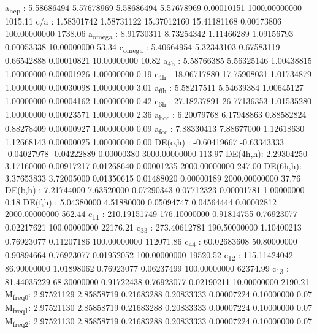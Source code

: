 \documentclass[11pt]{article}
\begin{document}
a\textsubscript{hcp}   :   5.58686494   5.57678969   5.58686494   5.57678969   0.00010151 1000.00000000      1015.11
c/a     :   1.58301742   1.58731122  15.37012160  15.41181168   0.00173806 100.00000000      1738.06
a\textsubscript{omega} :   8.91730311   8.73254342   1.11466289   1.09156793   0.00053338  10.00000000        53.34
c\textsubscript{omega} :   5.40664954   5.32343103   0.67583119   0.66542888   0.00010821  10.00000000        10.82
a\textsubscript{4h}    :   5.58766385   5.56325146   1.00438815   1.00000000   0.00001926   1.00000000         0.19
c\textsubscript{4h}    :  18.06717880  17.75908031   1.01734879   1.00000000   0.00030098   1.00000000         3.01
a\textsubscript{6h}    :   5.58217511   5.54639384   1.00645127   1.00000000   0.00004162   1.00000000         0.42
c\textsubscript{6h}    :  27.18237891  26.77136353   1.01535280   1.00000000   0.00023571   1.00000000         2.36
a\textsubscript{bcc}   :   6.20079768   6.17948863   0.88582824   0.88278409   0.00000927   1.00000000         0.09
a\textsubscript{fcc}   :   7.88330413   7.88677000   1.12618630   1.12668143   0.00000025   1.00000000         0.00
DE(o,h) :  -0.60419667  -0.63343333  -0.04027978  -0.04222889   0.00000380 3000.00000000       113.97
DE(4h,h):   2.29304250   3.17160000   0.00917217   0.01268640   0.00001235 2000.00000000       247.00
DE(6h,h):   3.37653833   3.72005000   0.01350615   0.01488020   0.00000189 2000.00000000        37.76
DE(b,h) :   7.21744000   7.63520000   0.07290343   0.07712323   0.00001781   1.00000000         0.18
DE(f,h) :   5.04380000   4.51880000   0.05094747   0.04564444   0.00002812 2000.00000000       562.44
c\textsubscript{11}    : 210.19151749 176.10000000   0.91814755   0.76923077   0.02217621 100.00000000     22176.21
c\textsubscript{33}    : 273.40612781 190.50000000   1.10400213   0.76923077   0.11207186 100.00000000    112071.86
c\textsubscript{44}    :  60.02683608  50.80000000   0.90894664   0.76923077   0.01952052 100.00000000     19520.52
c\textsubscript{12}    : 115.11424042  86.90000000   1.01898062   0.76923077   0.06237499 100.00000000     62374.99
c\textsubscript{13}    :  81.44035229  68.30000000   0.91722438   0.76923077   0.02190211  10.00000000      2190.21
M\textsubscript{freq}\textsubscript{0}:   2.97521129   2.85858719   0.21683288   0.20833333   0.00007224   0.10000000         0.07
M\textsubscript{freq}\textsubscript{1}:   2.97521130   2.85858719   0.21683288   0.20833333   0.00007224   0.10000000         0.07
M\textsubscript{freq}\textsubscript{2}:   2.97521130   2.85858719   0.21683288   0.20833333   0.00007224   0.10000000         0.07
\end{document}
